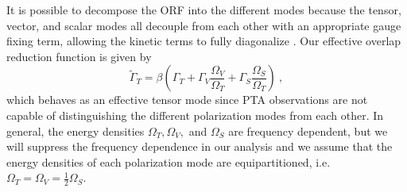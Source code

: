 \documentclass[prd,twocolumn,aps,psfig,nofootinbib,nobibnotes,superscriptaddress,preprintnumbers,times]{revtex4-2}
\begin{document}
It is possible to decompose the ORF into the different modes because the tensor, vector, and scalar modes all decouple from each other with an appropriate gauge fixing term, allowing the kinetic terms to fully diagonalize \cite{Hinterbichler:2011tt}. Our effective overlap reduction function is given by 
\begin{equation}\label{eq:eff_orf}
    \tilde{\Gamma}_{T} = \beta \left(\Gamma_{T} + \Gamma_{V} \frac{\Omega_V}{\Omega_T} + \Gamma_{S} \frac{\Omega_S}{\Omega_T} \right) \ ,
\end{equation}
which behaves as an effective tensor mode since PTA observations are not capable of distinguishing the different polarization modes from each other. In general, the energy densities $\Omega_T, \Omega_V,$ and $\Omega_S$ are frequency dependent, but we will suppress the frequency dependence in our analysis and we assume that the energy densities of each polarization mode are equipartitioned, i.e.\ $\Omega_T = \Omega_V = \frac{1}{2}\Omega_S$. 
\end{document}
